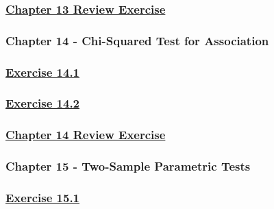 \documentclass[
  11pt,
]{book}
\begin{document}
\subsubsection*{\texorpdfstring{\hyperref[re13q]{Chapter 13 Review Exercise}}{Chapter 13 Review Exercise}}\label{chapter-13-review-exercise}

\subsubsection*{Chapter 14 - Chi-Squared Test for Association}\label{chapter-14---chi-squared-test-for-association}

\subsubsection*{\texorpdfstring{\hyperref[ex141q]{Exercise 14.1}}{Exercise 14.1}}\label{exercise-14.1-1}

\subsubsection*{\texorpdfstring{\hyperref[ex142q]{Exercise 14.2}}{Exercise 14.2}}\label{exercise-14.2-1}

\subsubsection*{\texorpdfstring{\hyperref[re14q]{Chapter 14 Review Exercise}}{Chapter 14 Review Exercise}}\label{chapter-14-review-exercise}

\subsubsection*{Chapter 15 - Two-Sample Parametric Tests}\label{chapter-15---two-sample-parametric-tests}

\subsubsection*{\texorpdfstring{\hyperref[ex151q]{Exercise 15.1}}{Exercise 15.1}}\label{exercise-15.1-1}
\end{document}
